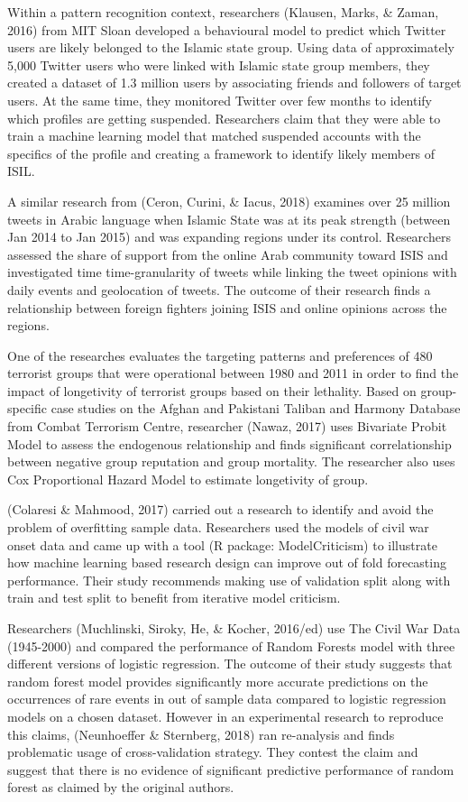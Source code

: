 \documentclass[11pt,oneside,a4paper]{reedthesis}
\begin{document}
Within a pattern recognition context, researchers (Klausen, Marks, \&
Zaman, 2016) from MIT Sloan developed a behavioural model to predict
which Twitter users are likely belonged to the Islamic state group.
Using data of approximately 5,000 Twitter users who were linked with
Islamic state group members, they created a dataset of 1.3 million users
by associating friends and followers of target users. At the same time,
they monitored Twitter over few months to identify which profiles are
getting suspended. Researchers claim that they were able to train a
machine learning model that matched suspended accounts with the
specifics of the profile and creating a framework to identify likely
members of ISIL.

A similar research from (Ceron, Curini, \& Iacus, 2018) examines over 25
million tweets in Arabic language when Islamic State was at its peak
strength (between Jan 2014 to Jan 2015) and was expanding regions under
its control. Researchers assessed the share of support from the online
Arab community toward ISIS and investigated time time-granularity of
tweets while linking the tweet opinions with daily events and
geolocation of tweets. The outcome of their research finds a
relationship between foreign fighters joining ISIS and online opinions
across the regions.

One of the researches evaluates the targeting patterns and preferences
of 480 terrorist groups that were operational between 1980 and 2011 in
order to find the impact of longetivity of terrorist groups based on
their lethality. Based on group-specific case studies on the Afghan and
Pakistani Taliban and Harmony Database from Combat Terrorism Centre,
researcher (Nawaz, 2017) uses Bivariate Probit Model to assess the
endogenous relationship and finds significant correlationship between
negative group reputation and group mortality. The researcher also uses
Cox Proportional Hazard Model to estimate longetivity of group.

(Colaresi \& Mahmood, 2017) carried out a research to identify and avoid
the problem of overfitting sample data. Researchers used the models of
civil war onset data and came up with a tool (R package: ModelCriticism)
to illustrate how machine learning based research design can improve out
of fold forecasting performance. Their study recommends making use of
validation split along with train and test split to benefit from
iterative model criticism.

Researchers (Muchlinski, Siroky, He, \& Kocher, 2016/ed) use The Civil
War Data (1945-2000) and compared the performance of Random Forests
model with three different versions of logistic regression. The outcome
of their study suggests that random forest model provides significantly
more accurate predictions on the occurrences of rare events in out of
sample data compared to logistic regression models on a chosen dataset.
However in an experimental research to reproduce this claims,
(Neunhoeffer \& Sternberg, 2018) ran re-analysis and finds problematic
usage of cross-validation strategy. They contest the claim and suggest
that there is no evidence of significant predictive performance of
random forest as claimed by the original authors.
\end{document}
